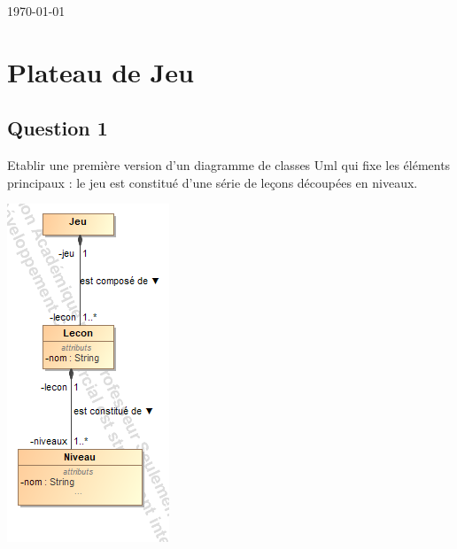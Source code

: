 \documentclass[11pt]{article}
\begin{document}
\begin{titlepage}
	
	
	\vfill\vfill\vfill %
	
	{\large\today} %
	
	
	 
	
	\vfill %
	
\end{titlepage}
\newpage

\section{Plateau de Jeu}

\subsection{Question 1}
Etablir une première version d'un diagramme de classes Uml qui fixe les éléments principaux : le jeu est constitué d'une série de leçons découpées en niveaux.

\includegraphics[scale=0.5]{Plateau_5_1.png}
\end{document}
